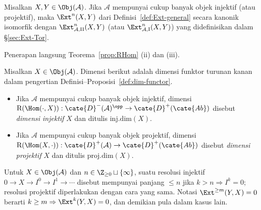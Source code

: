 \begin{korolari}\label{prop:Ext-reconcilation}
	Misalkan $X,Y\in\Obj(\mathcal{A})$. Jika $\mathcal{A}$ mempunyai cukup
	banyak objek injektif (atau projektif), maka $\Ext^n(X,Y)$ dari
	Definisi~\ref{def:Ext-general} secara kanonik isomorfik dengan
	$\Ext^n_{\mathcal{A},\mathrm{II}}(X,Y)$ (atau
	$\Ext^n_{\mathcal{A},\mathrm{I}}(X,Y)$) yang didefinisikan dalam
	\S\ref{sec:Ext-Tor}.
\end{korolari}
\begin{bukti}
	Penerapan langsung Teorema~\ref{prop:RHom} (ii) dan (iii).
\end{bukti}

\begin{definisi}
	Misalkan $X\in\Obj(\mathcal{A})$. Dimensi berikut adalah dimensi funktor
	turunan kanan dalam pengertian Definisi--Proposisi~\ref{def:dim-functor}.
	\begin{itemize}
		\item Jika $\mathcal{A}$ mempunyai cukup banyak objek injektif, dimensi
		$\mathrm{R}(\Hom(\cdot,X)):
		\cate{D}^-(\mathcal{A})^{\opp}\to\cate{D}^+(\cate{Ab})$ disebut
		\emph{dimensi injektif} $X$ dan ditulis $\mathrm{inj.dim}(X)$.
		\item Jika $\mathcal{A}$ mempunyai cukup banyak objek projektif, dimensi
		$\mathrm{R}(\Hom(X,\cdot)):
		\cate{D}^+(\mathcal{A})\to\cate{D}^+(\cate{Ab})$ disebut
		\emph{dimensi projektif} $X$ dan ditulis $\mathrm{proj.dim}(X)$.
	\end{itemize}
\end{definisi}

Untuk $X\in\Obj(\mathcal{A})$ dan
$n\in\Z_{\geq0}\sqcup\{\infty\}$, suatu resolusi injektif
$0\to X\to I^0\to I^1\to\cdots$ disebut mempunyai panjang $\leq n$ jika
$k>n\Rightarrow I^k=0$; resolusi projektif diperlakukan dengan cara yang sama.
Notasi $\Ext^{\geq m}(Y,X)=0$ berarti
$k\geq m\Rightarrow\Ext^k(Y,X)=0$, dan demikian pula dalam kasus lain.

